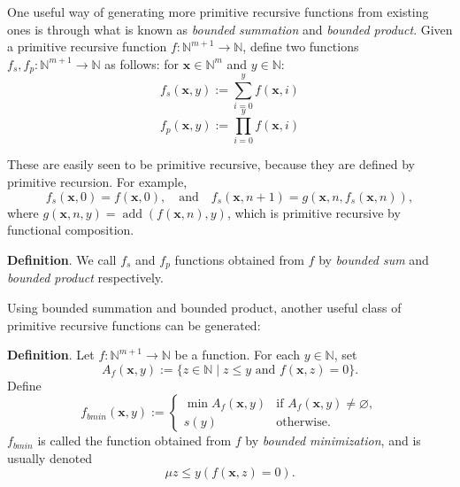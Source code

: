 \documentclass[12pt]{article}
\begin{document}
One useful way of generating more primitive recursive functions from existing ones is through what is known as \emph{bounded summation} and \emph{bounded product}.  Given a primitive recursive function $f:\mathbb{N}^{m+1} \to \mathbb{N}$, define two functions $f_s,f_p:\mathbb{N}^{m+1} \to \mathbb{N}$ as follows: for $\boldsymbol{x}\in \mathbb{N}^m$ and $y\in \mathbb{N}$:
$$f_s(\boldsymbol{x},y):=\sum_{i=0}^y f(\boldsymbol{x},i)$$
$$f_p(\boldsymbol{x},y):=\prod_{i=0}^y f(\boldsymbol{x},i)$$

These are easily seen to be primitive recursive, because they are defined by primitive recursion.  For example,
$$f_s(\boldsymbol{x},0)=f(\boldsymbol{x},0),\quad \mbox{and}\quad f_s(\boldsymbol{x},n+1)= g(\boldsymbol{x},n,f_s(\boldsymbol{x},n)),$$
where $g(\boldsymbol{x},n,y)=\operatorname{add}(f(\boldsymbol{x},n),y)$, which is primitive recursive by functional composition.

\textbf{Definition}. We call $f_s$ and $f_p$ functions obtained from $f$ by \emph{bounded sum} and \emph{bounded product} respectively.

Using bounded summation and bounded product, another useful class of primitive recursive functions can be generated:

\textbf{Definition}.  Let $f:\mathbb{N}^{m+1}\to \mathbb{N}$ be a function.  For each $y\in \mathbb{N}$, set $$A_f(\boldsymbol{x},y):=\lbrace z\in \mathbb{N}\mid z\le y \mbox{ and }f(\boldsymbol{x},z)=0\rbrace.$$  Define
\begin{displaymath}
f_{bmin}(\boldsymbol{x},y):= \left\{
\begin{array}{ll}
\min A_f(\boldsymbol{x},y) & \textrm{if } A_f(\boldsymbol{x},y) \ne \varnothing, \\
s(y) & \textrm{otherwise.}
\end{array}
\right.
\end{displaymath}
$f_{bmin}$ is called the function obtained from $f$ by \emph{bounded minimization}, and is usually denoted $$\mu z\le y (f(\boldsymbol{x},z)=0).$$
\end{document}
